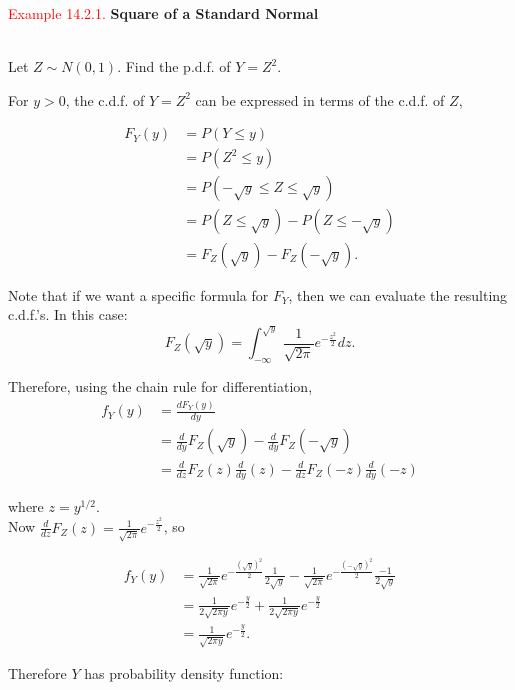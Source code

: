 \documentclass[
]{book}
\begin{document}
\leavevmode{}%
\textcolor{red}{Example 14.2.1.}
{\textbf{Square of a Standard Normal}}\\
\strut \\
Let \(Z\sim N(0,1)\). Find the p.d.f. of \(Y=Z^2\).

For \(y>0\), the c.d.f. of \(Y=Z^2\) can be expressed in terms of the c.d.f. of \(Z\),

\begin{align*}
F_Y(y) &= P(Y \leq y) \\
&= P(Z^2 \leq y) \\
&= P(-\sqrt{y} \leq Z \leq \sqrt{y}) \\
&= P(Z \leq \sqrt{y}) - P(Z \leq -\sqrt{y}) \\
&= F_Z(\sqrt{y}) - F_Z(-\sqrt{y}).
\end{align*}

Note that if we want a specific formula for \(F_Y\), then we can evaluate the resulting c.d.f.'s. In this case:\\

\[ F_Z(\sqrt{y}) = \int_{-\infty}^{\sqrt{y}} \frac{1}{\sqrt{2\pi}} e^{-\frac{z^2}{2}}dz.\]

Therefore, using the chain rule for differentiation,\\

\begin{align*}
f_Y(y) &= \frac{dF_Y(y)}{dy} \\
&= \frac{d}{dy}F_Z(\sqrt{y}) - \frac{d}{dy} F_Z(-\sqrt{y}) \\
&= \frac{d}{dz} F_Z(z) \frac{d}{dy}(z) - \frac{d}{dz} F_Z(-z) \frac{d}{dy}(-z)
\end{align*}

where \(z=y^{1/2}\).\\
Now \(\frac{d}{dz} F_Z(z) = \frac{1}{\sqrt{2\pi}} e^{-\frac{z^2}{2}}\), so

\begin{align*}
f_Y(y) &= \frac{1}{\sqrt{2\pi}} e^{-\frac{(\sqrt{y})^2}{2}} \frac{1}{2\sqrt{y}} - \frac{1}{\sqrt{2\pi}} e^{-\frac{(-\sqrt{y})^2}{2}} \frac{-1}{2\sqrt{y}} \\
&= \frac{1}{2\sqrt{2 \pi y}} e^{-\frac{y}{2}} + \frac{1}{2\sqrt{2 \pi y}} e^{-\frac{y}{2}} \\
&= \frac{1}{\sqrt{2 \pi y}} e^{-\frac{y}{2}}.
\end{align*}

Therefore \(Y\) has probability density function:\\
\end{document}
